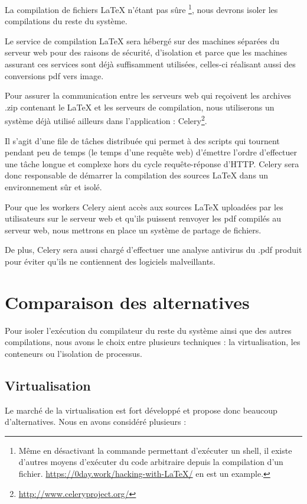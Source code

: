 \documentclass[10pt,a4paper]{article}
\begin{document}
La compilation de fichiers \LaTeX { }n'étant pas sûre \footnote{Même en désactivant la commande permettant d'exécuter un shell, il existe d'autres moyens d'exécuter du code arbitraire depuis la compilation d'un fichier.  \url{https://0day.work/hacking-with-LaTeX/} en est un example.}, nous devrons isoler les compilations du reste du système.

Le service de compilation \LaTeX { }sera hébergé sur des machines séparées du serveur web  pour des raisons de sécurité, d'isolation et parce que les machines assurant ces services sont déjà suffisamment utilisées, celles-ci réalisant aussi des conversions pdf vers image.

Pour assurer la communication entre les serveurs web qui reçoivent les archives .zip contenant le \LaTeX { }et les serveurs de compilation, nous utiliserons un système déjà utilisé ailleurs dans l'application :
Celery\footnote{\url{http://www.celeryproject.org/}}.

Il s'agit d'une file de tâches distribuée qui permet à des scripts qui tournent pendant peu de temps (le temps d'une requête web) d'émettre l'ordre d'effectuer une tâche longue et complexe hors du cycle requête-réponse d'HTTP.
Celery sera donc responsable de démarrer la compilation des sources \LaTeX { }dans un environnement sûr et isolé.

Pour que les workers Celery aient accès aux sources \LaTeX { }uploadées par les utilisateurs sur le serveur web et qu'ils puissent renvoyer les pdf compilés au serveur web, nous mettrons en place un système de partage de fichiers.

De plus, Celery sera aussi chargé d'effectuer une analyse antivirus du .pdf produit pour éviter qu'ils ne contiennent des logiciels malveillants.

\section{Comparaison des alternatives}
Pour isoler l'exécution du compilateur du reste du système ainsi que des autres compilations, nous avons le choix entre plusieurs techniques : la virtualisation, les conteneurs ou l'isolation de processus.

\subsection{Virtualisation}

Le marché de la virtualisation est fort développé et propose donc beaucoup d'alternatives. Nous en avons considéré plusieurs :
\end{document}
